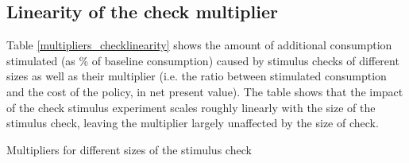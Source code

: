\documentclass[../HAFiscal]{subfiles}
\begin{document}
\subsection{Linearity of the check multiplier}

Table \ref{multipliers_checklinearity} shows the amount of additional consumption stimulated (as \% of baseline consumption) caused by stimulus checks of different sizes as well as their multiplier (i.e. the ratio between stimulated consumption and the cost of the policy, in net present value). The table shows that the impact of the check stimulus experiment scales roughly linearly with the size of the stimulus check, leaving the multiplier largely unaffected by the size of check.

\begin{table} 
	\center
	
	\caption{Multipliers for different sizes of the stimulus check}
	\label{multipliers_checklinearity}
\end{table}
\end{document}
